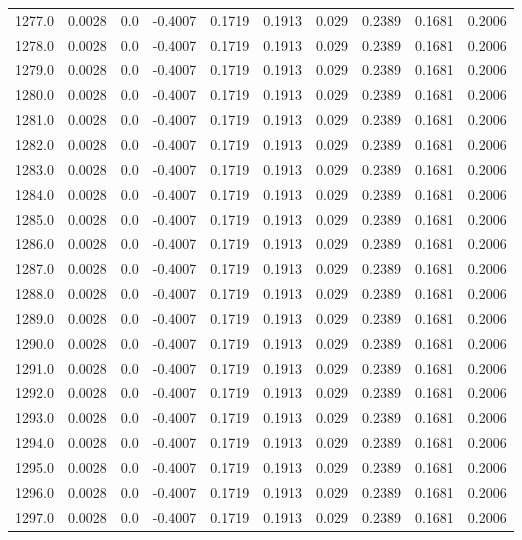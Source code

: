 \begin{longtable}{lrrrrrrrrr}
1277.0 & 0.0028 & 0.0 & -0.4007 & 0.1719 & 0.1913 & 0.029 & 0.2389 & 0.1681 & 0.2006 \\
1278.0 & 0.0028 & 0.0 & -0.4007 & 0.1719 & 0.1913 & 0.029 & 0.2389 & 0.1681 & 0.2006 \\
1279.0 & 0.0028 & 0.0 & -0.4007 & 0.1719 & 0.1913 & 0.029 & 0.2389 & 0.1681 & 0.2006 \\
1280.0 & 0.0028 & 0.0 & -0.4007 & 0.1719 & 0.1913 & 0.029 & 0.2389 & 0.1681 & 0.2006 \\
1281.0 & 0.0028 & 0.0 & -0.4007 & 0.1719 & 0.1913 & 0.029 & 0.2389 & 0.1681 & 0.2006 \\
1282.0 & 0.0028 & 0.0 & -0.4007 & 0.1719 & 0.1913 & 0.029 & 0.2389 & 0.1681 & 0.2006 \\
1283.0 & 0.0028 & 0.0 & -0.4007 & 0.1719 & 0.1913 & 0.029 & 0.2389 & 0.1681 & 0.2006 \\
1284.0 & 0.0028 & 0.0 & -0.4007 & 0.1719 & 0.1913 & 0.029 & 0.2389 & 0.1681 & 0.2006 \\
1285.0 & 0.0028 & 0.0 & -0.4007 & 0.1719 & 0.1913 & 0.029 & 0.2389 & 0.1681 & 0.2006 \\
1286.0 & 0.0028 & 0.0 & -0.4007 & 0.1719 & 0.1913 & 0.029 & 0.2389 & 0.1681 & 0.2006 \\
1287.0 & 0.0028 & 0.0 & -0.4007 & 0.1719 & 0.1913 & 0.029 & 0.2389 & 0.1681 & 0.2006 \\
1288.0 & 0.0028 & 0.0 & -0.4007 & 0.1719 & 0.1913 & 0.029 & 0.2389 & 0.1681 & 0.2006 \\
1289.0 & 0.0028 & 0.0 & -0.4007 & 0.1719 & 0.1913 & 0.029 & 0.2389 & 0.1681 & 0.2006 \\
1290.0 & 0.0028 & 0.0 & -0.4007 & 0.1719 & 0.1913 & 0.029 & 0.2389 & 0.1681 & 0.2006 \\
1291.0 & 0.0028 & 0.0 & -0.4007 & 0.1719 & 0.1913 & 0.029 & 0.2389 & 0.1681 & 0.2006 \\
1292.0 & 0.0028 & 0.0 & -0.4007 & 0.1719 & 0.1913 & 0.029 & 0.2389 & 0.1681 & 0.2006 \\
1293.0 & 0.0028 & 0.0 & -0.4007 & 0.1719 & 0.1913 & 0.029 & 0.2389 & 0.1681 & 0.2006 \\
1294.0 & 0.0028 & 0.0 & -0.4007 & 0.1719 & 0.1913 & 0.029 & 0.2389 & 0.1681 & 0.2006 \\
1295.0 & 0.0028 & 0.0 & -0.4007 & 0.1719 & 0.1913 & 0.029 & 0.2389 & 0.1681 & 0.2006 \\
1296.0 & 0.0028 & 0.0 & -0.4007 & 0.1719 & 0.1913 & 0.029 & 0.2389 & 0.1681 & 0.2006 \\
1297.0 & 0.0028 & 0.0 & -0.4007 & 0.1719 & 0.1913 & 0.029 & 0.2389 & 0.1681 & 0.2006 \\

\end{longtable}

